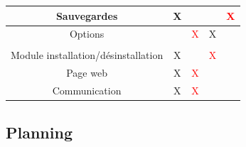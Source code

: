 \documentclass[]{extarticle}
\begin{document}
\begin{tabular}{|*{5}{c|}}
	\hline
	\cellcolor{WhiteSmoke}Sauvegardes & X & & & \textcolor{red}{X} \\
	\hline
	\cellcolor{WhiteSmoke}Options & & \textcolor{red}{X} & X & \\
	\hline
	\rowcolor{Lavender}\multicolumn{5}{|c|}{DISTRIBUTION} \\
	\hline
	\cellcolor{WhiteSmoke}Module installation/désinstallation & X & & \textcolor{red}{X} & \\
	\hline
	\cellcolor{WhiteSmoke}Page web & X & \textcolor{red}{X} & & \\
	\hline
	\cellcolor{WhiteSmoke}Communication & X & \textcolor{red}{X} & & \\
	\hline
\end{tabular}
\bigbreak
\newpage
	\subsection{Planning}
\bigbreak
\bigbreak
\end{document}

